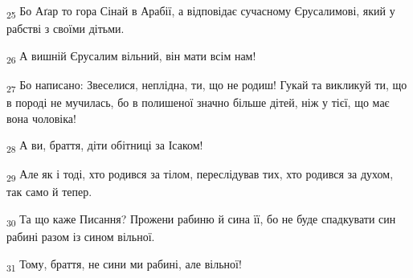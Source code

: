 \begin{tcolorbox}
\textsubscript{25} Бо Аґар то гора Сінай в Арабії, а відповідає сучасному Єрусалимові, який у рабстві з своїми дітьми.
\end{tcolorbox}
\begin{tcolorbox}
\textsubscript{26} А вишній Єрусалим вільний, він мати всім нам!
\end{tcolorbox}
\begin{tcolorbox}
\textsubscript{27} Бо написано: Звеселися, неплідна, ти, що не родиш! Гукай та викликуй ти, що в породі не мучилась, бо в полишеної значно більше дітей, ніж у тієї, що має вона чоловіка!
\end{tcolorbox}
\begin{tcolorbox}
\textsubscript{28} А ви, браття, діти обітниці за Ісаком!
\end{tcolorbox}
\begin{tcolorbox}
\textsubscript{29} Але як і тоді, хто родився за тілом, переслідував тих, хто родився за духом, так само й тепер.
\end{tcolorbox}
\begin{tcolorbox}
\textsubscript{30} Та що каже Писання? Прожени рабиню й сина її, бо не буде спадкувати син рабині разом із сином вільної.
\end{tcolorbox}
\begin{tcolorbox}
\textsubscript{31} Тому, браття, не сини ми рабині, але вільної!
\end{tcolorbox}
